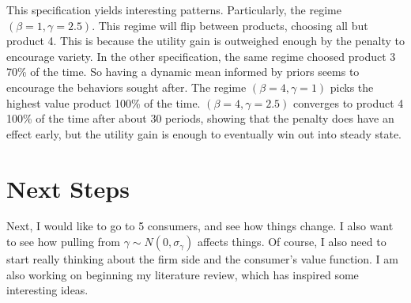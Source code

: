 \documentclass[11pt]{article}
\theoremstyle{definition}
\theoremstyle{remark}
\begin{document}
This specification yields interesting patterns. Particularly, the regime $(\beta=1, \gamma=2.5)$. This regime will flip between products, choosing all but product 4. This is because the utility gain is outweighed enough by the penalty to encourage variety. In the other specification, the same regime choosed product 3 70\% of the time. 
So having a dynamic mean informed by priors seems to encourage the behaviors sought after. The regime $(\beta=4, \gamma=1)$ picks the highest value product 100\% of the time. $(\beta=4, \gamma=2.5)$ converges to product 4 100\% of the time after about 30 periods, showing that the penalty does have an effect early, but the utility gain is enough to eventually win out into steady state.

\section{Next Steps}

Next, I would like to go to 5 consumers, and see how things change. I also want to see how pulling from $\gamma\sim N(0, \sigma_{\gamma})$ affects things. Of course, I also need to start really thinking about the firm side and the consumer's value function. I am also working on beginning my literature review, which has inspired some interesting ideas.
\end{document}
